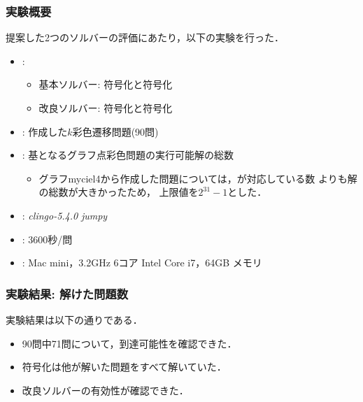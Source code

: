 \documentclass[dvipdfmx,11pt]{beamer}
\begin{document}
\begin{frame}\frametitle{実験概要}
  提案した2つのソルバーの評価にあたり，以下の実験を行った．
  \bigskip
  \begin{itemize}
    \item {}: 
          \begin{itemize}
            \item 基本ソルバー: 符号化と符号化
            \item 改良ソルバー: 符号化と符号化
          \end{itemize}
    \item {}: 作成した$k$彩色遷移問題(90問)
    \item {}: 基となるグラフ点彩色問題の実行可能解の総数
          \begin{itemize}
            \item グラフmyciel4から作成した問題については，{\clingo}が対応している数
                  よりも解の総数が大きかったため，
                  上限値を$2^{31}-1$とした．
          \end{itemize}
    \item {}: \textit{clingo-5.4.0} \textit{jumpy}
    \item {}: 3600秒/問
    \item {}: Mac mini，3.2GHz 6コア Intel Core i7，64GB メモリ
  \end{itemize}
  
\end{frame}


\begin{frame}\frametitle{実験結果: 解けた問題数}

実験結果は以下の通りである．
\bigskip

\begin{exampleblock}{}
  \centering
  \scalebox{0.8}{}
\end{exampleblock}
  
  \begin{itemize}
    \item 90問中71問について，到達可能性を確認できた．
    \item {}符号化は他が解いた問題をすべて解いていた．
    \item 改良ソルバーの有効性が確認できた．
  \end{itemize}

\end{frame}
\end{document}
